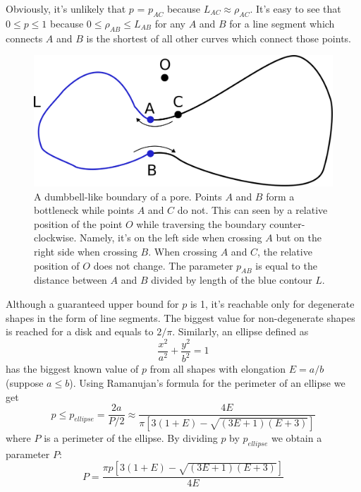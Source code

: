 \documentclass[reprint,amsmath,amssymb,aps,pre,showkeys,showpacs]{revtex4-1}
\begin{document}
Obviously, it's unlikely that $p$ = $p_{AC}$ because $L_{AC} \approx \rho_{AC}$.
It's easy to see that $0 \le p \le 1$ because $0 \le \rho_{AB} \le L_{AB}$ for
any $A$ and $B$ for a line segment which connects $A$ and $B$ is the shortest
of all other curves which connect those points.
\begin{figure}
  \centering
  \includegraphics[width=0.9\linewidth]{images/parameter.png}
  \caption[]{A dumbbell-like boundary of a pore. Points $A$ and $B$ form a
    bottleneck while points $A$ and $C$ do not. This can seen by a relative
    position of the point $O$ while traversing the boundary
    counter-clockwise. Namely, it's on the left side when crossing $A$ but on
    the right side when crossing $B$. When crossing $A$ and $C$, the relative
    position of $O$ does not change. The parameter $p_{AB}$ is equal to the
    distance between $A$ and $B$ divided by length of the blue contour $L$.}
  \label{fig:parameter}
\end{figure}

Although a guaranteed upper bound for $p$ is 1, it's reachable only for
degenerate shapes in the form of line segments. The biggest value for
non-degenerate shapes is reached for a disk and equals to $2/\pi$. Similarly, an
ellipse defined as
\begin{equation*}
  \frac{x^2}{a^2} + \frac{y^2}{b^2} = 1
\end{equation*}
has the biggest known value of $p$ from all shapes with elongation $E = a / b$
(suppose $a \le b$). Using Ramanujan's formula for the perimeter of an ellipse
we get
\begin{equation*}
  p \le p_{ellipse} = \frac{2a}{P/2} \approx \frac{4E}{\pi[3(1+E) - \sqrt{(3E+1)(E+3)}]}
\end{equation*}
where $P$ is a perimeter of the ellipse. By dividing $p$ by $p_{ellipse}$ we
obtain a parameter $P$:
\begin{equation*}
  P = \frac{\pi p [3(1+E) - \sqrt{(3E+1)(E+3)}]}{4E}
\end{equation*}
\end{document}
